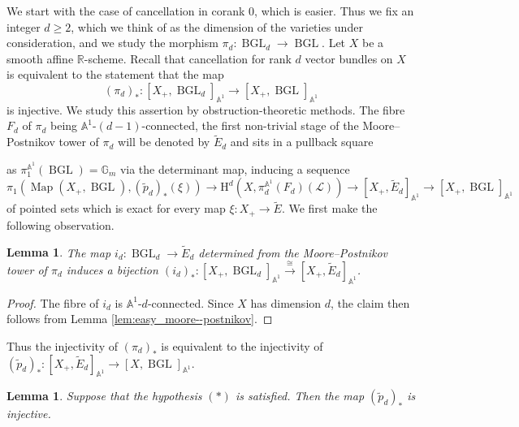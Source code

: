 \documentclass[11pt,leqno]{amsart}
\renewcommand{\1}{{\rm 1\hspace*{-0.4ex}%
\rule{0.1ex}{1.52ex}\hspace*{0.2ex}}}
\renewcommand{\Lc}{{\mathcal L}}
\newcommand{\Hr}{{\mathrm {H}}}
\newcommand{\<}[1]{{\langle}#1 {\rangle}}
\newcommand{\Rb}{\mathbb{R}}
\newcommand{\Kr}{\mathrm{K}}
\newcommand{\Abb}{\mathbb{A}}
\newcommand{\BGL}{\operatorname{BGL}}
\newcommand{\Br}{\mathrm{B}}
\newcommand{\Map}{\operatorname{Map}}
\theoremstyle{plain}
\newtheorem{lem}[thm]{Lemma}
\theoremstyle{definition}
\theoremstyle{remark}
\numberwithin{equation}{section}
\begin{document}
We start with the case of cancellation in corank $0$, which is easier. Thus we fix an integer $d\geq 2$, which we think of as the dimension of the varieties under consideration, and we study the morphism $\pi_d:\BGL_d\rightarrow\BGL$. Let $X$ be a smooth affine $\Rb$-scheme. Recall that cancellation for rank $d$ vector bundles on $X$ is equivalent to the statement that the map \[(\pi_d)_*:[X_+,\BGL_d]_{\Abb^1}\to[X_+,\BGL]_{\Abb^1}\] is injective. We study this assertion by obstruction-theoretic methods. The fibre $F_d$ of $\pi_d$ being $\Abb^1$-$(d-1)$-connected, the first non-trivial stage of the Moore--Postnikov tower of $\pi_d$ will be denoted by $\widetilde{E}_{d}$ and sits in a pullback square
\begin{center}
\end{center}
as $\pi_1^{\Abb^1}(\BGL)=\mathbb{G}_m$ via the determinant map, inducing a sequence
\begin{equation}\label{eq:corank_0}
\pi_1(\Map(X_+,\BGL),(\widetilde{p}_d)_*(\xi))\to\Hr^d(X,\pi_d^{\Abb^1}(F_d)(\Lc))\to[X_+,\widetilde{E}_d]_{\Abb^1}\to[X_+,\BGL]_{\Abb^1}
\end{equation}
of pointed sets which is exact for every map $\xi:X_+\to\widetilde{E}$. We first make the following observation.

\begin{lem}\label{lem:bijectivity_corank_0}
The map $i_d:\BGL_d\to\widetilde{E}_d$ determined from the Moore--Postnikov tower of $\pi_d$ induces a bijection $(i_d)_*:[X_+,\BGL_d]_{\Abb^1}\xrightarrow{\cong}[X_+,\widetilde{E}_d]_{\Abb^1}$.
\end{lem}

\begin{proof}
The fibre of $i_d$ is $\Abb^1$-$d$-connected. Since $X$ has dimension $d$, the claim then follows from Lemma \ref{lem:easy_moore--postnikov}.
\end{proof}

Thus the injectivity of $(\pi_d)_*$ is equivalent to the injectivity of $(\widetilde{p}_d)_*:[X_+,\widetilde{E}_d]_{\Abb^1}\to[X,\BGL]_{\Abb^1}$. 

\begin{lem}\label{lem:injectivity_corank_0}
Suppose that the hypothesis $(*)$ is satisfied. Then the map $(\widetilde{p}_d)_*$ is injective.
\end{lem}
\end{document}
